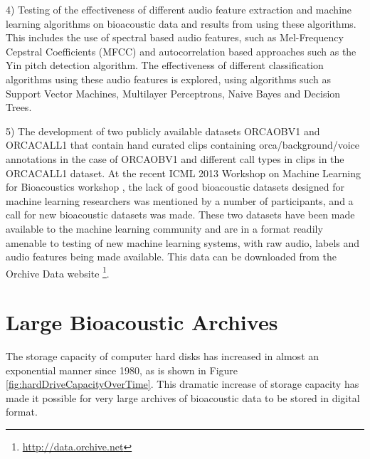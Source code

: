 4) Testing of the effectiveness of different audio feature extraction
and machine learning algorithms on bioacoustic data and results from
using these algorithms.  This includes the use of spectral based audio
features, such as Mel-Frequency Cepstral Coefficients (MFCC) and
autocorrelation based approaches such as the Yin pitch detection
algorithm.  The effectiveness of different classification algorithms
using these audio features is explored, using algorithms such as
Support Vector Machines, Multilayer Perceptrons, Naive Bayes and
Decision Trees.

5) The development of two publicly available datasets ORCAOBV1 and
ORCACALL1 that contain \totalClipsInORCAOBV hand curated clips
containing orca/background/voice annotations in the case of ORCAOBV1
and \totalCallsInORCACALL different call types in \totalClipsInORCACALL
clips in the ORCACALL1 dataset.  At the recent ICML 2013 Workshop on
Machine Learning for Bioacoustics workshop \cite{halkias2013icml4b},
the lack of good bioacoustic datasets designed for machine learning
researchers was mentioned by a number of participants, and a call for
new bioacoustic datasets was made.  These two datasets have been made
available to the machine learning community and are in a format
readily amenable to testing of new machine learning systems, with raw
audio, labels and audio features being made available.  This data can
be downloaded from the Orchive Data
website \footnote{\url{http://data.orchive.net}}.


\section{Large Bioacoustic Archives}

The storage capacity of computer hard disks has increased in almost an
exponential manner since 1980, as is shown in Figure
\ref{fig:hardDriveCapacityOverTime}.  This dramatic increase of
storage capacity has made it possible for very large archives of
bioacoustic data to be stored in digital format.

